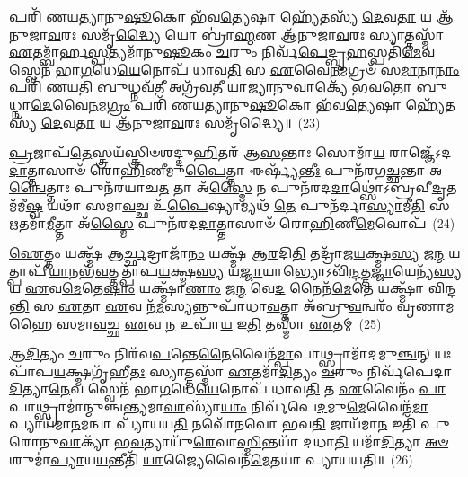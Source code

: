 𑌪𑌰𑌿᳴ 𑌣𑌯𑌤𑍍𑌯𑌾𑌨𑍁\-\ul{𑌷𑍂}\-𑌕𑍋 𑌭᳴𑌵\-\ul{𑌤𑍍𑌯𑍇}\-𑌷𑌾 𑌹𑍍𑌯𑍇᳴𑌤𑌸𑍍𑌯᳴ \ul{𑌦𑍇}\-𑌵\-\ul{𑌤𑌾} 𑌯 𑌆᳴𑌨𑍁𑌜𑌾\-\ul{𑌵}\-𑌰𑌃 𑌸𑌮𑍃᳴\-\ul{𑌦𑍍𑌧𑍍𑌯𑍈} 𑌯𑍋 𑌬𑍍𑌰𑌾॑\-\ul{𑌹𑍍𑌮}\-𑌣 𑌆᳴𑌨𑍁𑌜𑌾\-\ul{𑌵}\-𑌰𑌃 𑌸𑍍𑌯𑌾𑌤𑍍𑌤𑌸𑍍𑌮𑌾᳴ \ul{𑌏}\-𑌤𑌮𑍍𑌬𑌾᳴𑌰𑍍\mbox{}𑌹\-\ul{𑌸𑍍𑌪}\-𑌤𑍍𑌯𑌮𑌾᳴𑌨𑍁\-\ul{𑌷𑍂}\-𑌕𑌂 \ul{𑌚}\-𑌰𑍁𑌂 𑌨𑌿𑌰𑍍𑌵᳴\-\ul{𑌪𑍇}\-𑌦𑍍𑌬𑍃\-\ul{𑌹}\-𑌸𑍍𑌪𑌤𑌿᳴\-\ul{𑌮𑍇}\-𑌵 𑌸𑍍𑌵𑍇𑌨᳴ 𑌭𑌾\-\ul{𑌗}\-𑌧𑍇\-\ul{𑌯𑍇}\-𑌨𑍋𑌪᳴ 𑌧𑌾𑌵\-\ul{𑌤𑌿} 𑌸 \ul{𑌏}\-𑌵𑍈\-\ul{𑌨}\-𑌮𑌗𑍍𑌰𑍞᳴ 𑌸\-\ul{𑌮𑌾}\-𑌨𑌾\-\ul{𑌨𑌾𑌂} 𑌪𑌰𑌿᳴ 𑌣𑌯𑌤𑌿 \ul{𑌬𑍁}\-𑌧𑍍𑌨𑌵᳴\-\ul{𑌤𑍀} 𑌅𑌗𑍍𑌰᳴𑌵𑌤𑍀 𑌯𑌾𑌜𑍍𑌯𑌾𑌨𑍁\-\ul{𑌵𑌾}\-𑌕𑍍𑌯𑍇᳴ 𑌭𑌵𑌤𑍋 \ul{𑌬𑍁}\-𑌧𑍍𑌨𑌾\-\ul{𑌦𑍇}\-𑌵𑍈\-\ul{𑌨}\-𑌮\-\ul{𑌗𑍍𑌰𑌂} 𑌪𑌰𑌿᳴ 𑌣𑌯𑌤𑍍𑌯𑌾𑌨𑍁\-\ul{𑌷𑍂}\-𑌕𑍋 𑌭᳴𑌵\-\ul{𑌤𑍍𑌯𑍇}\-𑌷𑌾 𑌹𑍍𑌯𑍇᳴𑌤𑌸𑍍𑌯᳴ \ul{𑌦𑍇}\-𑌵\-\ul{𑌤𑌾} 𑌯 𑌆᳴𑌨𑍁𑌜𑌾\-\ul{𑌵}\-𑌰𑌃 𑌸𑌮𑍃᳴𑌦𑍍𑌧𑍍𑌯𑍈॥~(23)

{\anuvakamend[{\-\ul{𑌏}\-𑌵 𑌨𑌿𑌰𑌗𑍍𑌰᳴\-\ul{𑌮𑍇}\-𑌤𑌸𑍍𑌯᳴ \ul{𑌚}\-𑌤𑍍𑌵𑌾𑌰𑌿᳴ 𑌚}]}%

\-\ul{𑌪𑍍𑌰}\-𑌜𑌾𑌪᳴\-\ul{𑌤𑍇}\-𑌸𑍍𑌤𑍍𑌰𑌯᳴𑌸𑍍𑌤𑍍𑌰𑌿𑍞𑌶𑌦𑍍𑌦𑍁\-\ul{𑌹𑌿}\-𑌤𑌰᳴ 𑌆\-\ul{𑌸}\-𑌨𑍍𑌤𑌾𑌃 𑌸𑍋𑌮𑌾᳴\-\ul{𑌯} 𑌰𑌾𑌜𑍍𑌞𑍇᳴\-𑌽𑌦\-\ul{𑌦𑌾}\-𑌤𑍍𑌤𑌾𑌸𑌾𑍞᳴ 𑌰𑍋\-\ul{𑌹𑌿}\-𑌣𑍀𑌮𑍁\-\ul{𑌪𑍈}\-𑌤𑍍𑌤𑌾 𑌈𑌰𑍍𑌷𑍍𑌯᳴\-\ul{𑌨𑍍𑌤𑍀𑌃} 𑌪𑍁𑌨᳴𑌰𑌗\-\ul{𑌚𑍍𑌛}\-𑌨𑍍𑌤𑌾 𑌅\-\ul{𑌨𑍍𑌵𑍈}\-𑌤𑍍𑌤𑌾𑌃 𑌪𑍁𑌨᳴𑌰𑌯𑌾𑌚\-\ul{𑌤} 𑌤𑌾 𑌅᳴\-\ul{𑌸𑍍𑌮𑍈} 𑌨 𑌪𑍁𑌨᳴𑌰𑌦\-\ul{𑌦𑌾}\-𑌥𑍍𑌸𑍋॑\-𑌽𑌬𑍍𑌰𑌵𑍀\-\ul{𑌦𑍃}\-𑌤𑌮᳴𑌮𑍀\-\ul{𑌷𑍍𑌵} 𑌯𑌥𑌾᳴ 𑌸𑌮𑌾\-\ul{𑌵}\-𑌚𑍍𑌛 𑌉᳴\-\ul{𑌪𑍈}\-𑌷𑍍𑌯𑌾𑌮𑍍𑌯𑌥᳴ \ul{𑌤𑍇} 𑌪𑍁𑌨᳴𑌰𑍍𑌦𑌾\-\ul{𑌸𑍍𑌯𑌾}\-𑌮𑍀\-\ul{𑌤𑌿} 𑌸 \ul{𑌋}\-𑌤𑌮𑌾᳴\-\ul{𑌮𑍀}\-𑌤𑍍𑌤𑌾 𑌅᳴\-\ul{𑌸𑍍𑌮𑍈} 𑌪𑍁𑌨᳴𑌰𑌦\-\ul{𑌦𑌾}\-𑌤𑍍𑌤𑌾𑌸𑌾𑍞᳴ 𑌰𑍋\-\ul{𑌹𑌿}\-𑌣𑍀\-\ul{𑌮𑍇}\-𑌵𑍋𑌪᳴~(24)

\-\ul{𑌐}\-𑌤𑍍𑌤𑌂 𑌯𑌕𑍍𑌷𑍍𑌮᳴ 𑌆\-\ul{𑌰𑍍𑌚𑍍𑌛}\-𑌦𑍍𑌰𑌾𑌜𑌾᳴\-\ul{𑌨𑌂} 𑌯𑌕𑍍𑌷𑍍𑌮᳴ 𑌆\-\ul{𑌰}\-𑌦𑌿\-\ul{𑌤𑌿} 𑌤𑌦𑍍𑌰𑌾᳴𑌜\-\ul{𑌯}\-𑌕𑍍𑌷𑍍𑌮\-\ul{𑌸𑍍𑌯} 𑌜\-\ul{𑌨𑍍𑌮} 𑌯𑌤𑍍𑌪𑌾𑌪𑍀᳴\-\ul{𑌯𑌾}\-𑌨𑌭᳴\-\ul{𑌵}\-𑌤𑍍𑌤𑌤𑍍𑌪𑌾᳴𑌪\-\ul{𑌯}\-𑌕𑍍𑌷𑍍𑌮\-\ul{𑌸𑍍𑌯} 𑌯\-\ul{𑌜𑍍𑌜𑌾}\-𑌯𑌾𑌭𑍍𑌯𑍋\-𑌽𑌵𑌿᳴\-\ul{𑌨𑍍𑌦}\-𑌤𑍍𑌤\-\ul{𑌜𑍍𑌜𑌾}\-𑌯𑍇𑌨𑍍𑌯᳴\-\ul{𑌸𑍍𑌯} 𑌯 \ul{𑌏}\-𑌵\-\ul{𑌮𑍇}\-𑌤𑍇\-\ul{𑌷𑌾𑌂} 𑌯𑌕𑍍𑌷𑍍𑌮𑌾᳴\-\ul{𑌣𑌾𑌂} 𑌜\-\ul{𑌨𑍍𑌮} 𑌵𑍇\-\ul{𑌦} 𑌨𑍈𑌨᳴\-\ul{𑌮𑍇}\-𑌤𑍇 𑌯𑌕𑍍𑌷𑍍𑌮𑌾᳴ 𑌵𑌿𑌨𑍍𑌦\-\ul{𑌨𑍍𑌤𑌿} 𑌸 \ul{𑌏}\-𑌤𑌾 \ul{𑌏}\-𑌵 𑌨᳴\-\ul{𑌮}\-𑌸𑍍𑌯𑌨𑍍𑌨𑍁𑌪𑌾᳴𑌧𑌾\-\ul{𑌵}\-𑌤𑍍𑌤𑌾 𑌅᳴𑌬𑍍𑌰𑍁\-\ul{𑌵}\-𑌨𑍍𑌵𑌰𑌂᳴ 𑌵𑍃𑌣𑌾𑌮𑌹𑍈 𑌸𑌮𑌾\-\ul{𑌵}\-𑌚𑍍𑌛 \ul{𑌏}\-𑌵 \ul{𑌨} 𑌉𑌪𑌾᳴\-\ul{𑌯} 𑌇\-\ul{𑌤𑌿} 𑌤𑌸𑍍𑌮𑌾᳴ \ul{𑌏}\-𑌤𑌮𑍍~(25)

\-\ul{𑌆}\-\-\ul{𑌦𑌿}\-𑌤𑍍𑌯𑌂 \ul{𑌚}\-𑌰𑍁𑌂 𑌨𑌿𑌰᳴𑌵\-\ul{𑌪}\-𑌨𑍍𑌤𑍇\-\ul{𑌨𑍈}\-𑌵𑍈𑌨᳴\-\ul{𑌮𑍍𑌪𑌾}\-𑌪𑌾𑌥𑍍𑌸𑍍𑌰𑌾𑌮𑌾᳴𑌦𑌮𑍁\-\ul{𑌞𑍍𑌚}\-𑌨𑍍 𑌯𑌃 𑌪𑌾᳴𑌪\-\ul{𑌯}\-𑌕𑍍𑌷𑍍𑌮𑌗𑍃᳴𑌹𑍀\-\ul{𑌤𑌃} 𑌸𑍍𑌯𑌾𑌤𑍍𑌤𑌸𑍍𑌮𑌾᳴ \ul{𑌏}\-𑌤𑌮𑌾᳴\-\ul{𑌦𑌿}\-𑌤𑍍𑌯𑌂 \ul{𑌚}\-𑌰𑍁𑌂 𑌨𑌿𑌰𑍍𑌵᳴𑌪𑍇𑌦𑌾\-\ul{𑌦𑌿}\-𑌤𑍍𑌯𑌾\-\ul{𑌨𑍇}\-𑌵 𑌸𑍍𑌵𑍇𑌨᳴ 𑌭𑌾\-\ul{𑌗}\-𑌧𑍇\-\ul{𑌯𑍇}\-𑌨𑍋𑌪᳴ 𑌧𑌾𑌵\-\ul{𑌤𑌿} 𑌤 \ul{𑌏}\-𑌵𑍈𑌨𑌂᳴ \ul{𑌪𑌾}\-𑌪𑌾𑌥𑍍𑌸𑍍𑌰𑌾𑌮𑌾॑𑌨𑍍𑌮𑍁𑌞𑍍𑌚𑌨𑍍𑌤𑍍𑌯𑌮𑌾\-\ul{𑌵𑌾}\-𑌸𑍍𑌯𑌾᳴\-\ul{𑌯𑌾𑌂} 𑌨𑌿𑌰𑍍𑌵᳴𑌪𑍇\-\ul{𑌦}\-𑌮𑍁\-\ul{𑌮𑍇}\-𑌵𑍈𑌨᳴\-\ul{𑌮𑌾}\-𑌪𑍍𑌯𑌾𑌯᳴𑌮𑌾\-\ul{𑌨}\-𑌮𑌨𑍍𑌵𑌾 𑌪𑍍𑌯𑌾᳴𑌯𑌯\-\ul{𑌤𑌿} 𑌨𑌵𑍋᳴𑌨𑌵𑍋 𑌭𑌵\-\ul{𑌤𑌿} 𑌜𑌾𑌯᳴𑌮𑌾\-\ul{𑌨} 𑌇𑌤𑌿᳴ 𑌪𑍁𑌰𑍋𑌨𑍁\-\ul{𑌵𑌾}\-𑌕𑍍𑌯𑌾᳴ 𑌭\-\ul{𑌵}\-𑌤𑍍𑌯𑌾𑌯𑍁᳴\-\ul{𑌰𑍇}\-𑌵𑌾\-\ul{𑌸𑍍𑌮𑌿}\-𑌨𑍍𑌤𑌯𑌾᳴ 𑌦𑌧𑌾\-\ul{𑌤𑌿} 𑌯𑌮𑌾᳴\-\ul{𑌦𑌿}\-𑌤𑍍𑌯𑌾 \ul{𑌅}\-\-\ul{𑍞}\-𑌶𑍁𑌮𑌾॑\-\ul{𑌪𑍍𑌯𑌾}\-𑌯\-\ul{𑌯}\-𑌨𑍍𑌤𑍀𑌤𑌿᳴ \ul{𑌯𑌾}\-𑌜𑍍𑌯𑍈𑌵𑍈𑌨᳴\-\ul{𑌮𑍇}\-𑌤𑌯𑌾॑ 𑌪𑍍𑌯𑌾𑌯𑌯𑌤𑌿॥~(26)

